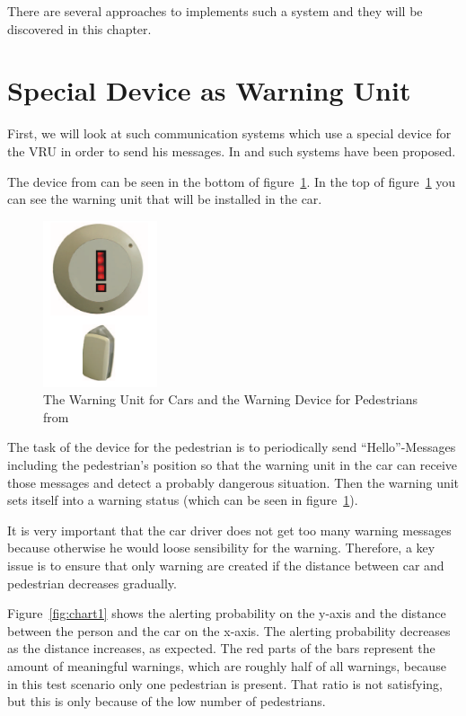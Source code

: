 \documentclass[]{ccs-thesis}
\begin{document}
There are several approaches to implements such a system and they will be discovered in this chapter.

\section{Special Device as Warning Unit}\label{sec:special device}

First, we will look at such communication systems which use a special device for the \ac{VRU} in order to send his messages. In \cite{v2pprotection} and \cite{watchover} such systems have been proposed. 

The device from \cite{v2pprotection} can be seen in the bottom of figure~\ref{fig:device}. In the top of figure~\ref{fig:device} you can see the warning unit that will be installed in the car.

\begin{figure}[h]
	\centering
	\includegraphics[width=0.3\textwidth]{figures/1_device}
	\caption{The Warning Unit for Cars and the Warning Device for Pedestrians from \cite{v2pprotection}}%
	\label{fig:device}%
\end{figure}

The task of the device for the pedestrian is to periodically send \enquote{Hello}-Messages including the pedestrian's position so that the warning unit in the car can receive those messages and detect a probably dangerous situation. Then the warning unit sets itself into a warning status (which can be seen in figure~\ref{fig:device}).

It is very important that the car driver does not get too many warning messages because otherwise he would loose sensibility for the warning. Therefore, a key issue is to ensure that only warning are created if the distance between car and pedestrian decreases gradually.

Figure~\ref{fig:chart1} shows the alerting probability on the y-axis and the distance between the person and the car on the x-axis. The alerting probability decreases as the distance increases, as expected. The red parts of the bars represent the amount of meaningful warnings, which are roughly half of all warnings, because in this test scenario only one pedestrian is present. That ratio is not satisfying, but this is only because of the low number of pedestrians.
\end{document}

